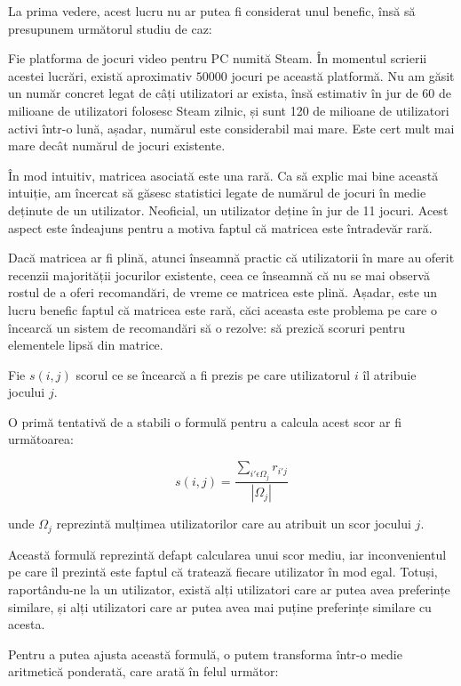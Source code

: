 \documentclass[12pt,a4paper]{report}
\begin{document}
La prima vedere, acest lucru nu ar putea fi considerat unul benefic, însă să presupunem următorul studiu de caz:

\bigskip

Fie platforma de jocuri video pentru PC numită Steam. În momentul scrierii acestei lucrări, există aproximativ \( 50 000 \) jocuri pe această platformă. \cite{29} Nu am găsit un număr concret legat de câți utilizatori ar exista, însă estimativ în jur de 60 de milioane de utilizatori folosesc Steam zilnic, și sunt 120 de milioane de utilizatori activi într-o lună, așadar, numărul este considerabil mai mare. Este cert mult mai mare decât numărul de jocuri existente.

În mod intuitiv, matricea asociată este una rară. Ca să explic mai bine această intuiție, am încercat să găsesc statistici legate de numărul de jocuri în medie deținute de un utilizator. Neoficial, un utilizator deține în jur de 11 jocuri. Acest aspect este îndeajuns pentru a motiva faptul că matricea este întradevăr rară.

Dacă matricea ar fi plină, atunci înseamnă practic că utilizatorii în mare au oferit recenzii majorității jocurilor existente, ceea ce înseamnă că nu se mai observă rostul de a oferi recomandări, de vreme ce matricea este plină. Așadar, este un lucru benefic faptul că matricea este rară, căci aceasta este problema pe care o încearcă un sistem de recomandări să o rezolve: să prezică scoruri pentru elementele lipsă din matrice.

\bigskip

Fie \( s(i, j) \) scorul ce se încearcă a fi prezis pe care utilizatorul \( i \) îl atribuie jocului \( j \).

\noindent O primă tentativă de a stabili o formulă pentru a calcula acest scor ar fi următoarea:

\[ s(i, j) = \dfrac{ \sum\limits_{i' \epsilon \Omega_{j} } r_{i'j} }{|\Omega_{j}|}\]

unde \( \Omega_{j}\) reprezintă mulțimea utilizatorilor care au atribuit un scor jocului \( j \).

\bigskip

Această formulă reprezintă defapt calcularea unui scor mediu, iar inconvenientul pe care îl prezintă este faptul că tratează fiecare utilizator în mod egal. Totuși, raportându-ne la un utilizator, există alți utilizatori care ar putea avea preferințe similare, și alți utilizatori care ar putea avea mai puține preferințe similare cu acesta.

Pentru a putea ajusta această formulă, o putem transforma într-o medie aritmetică ponderată, care arată în felul următor:
\end{document}
